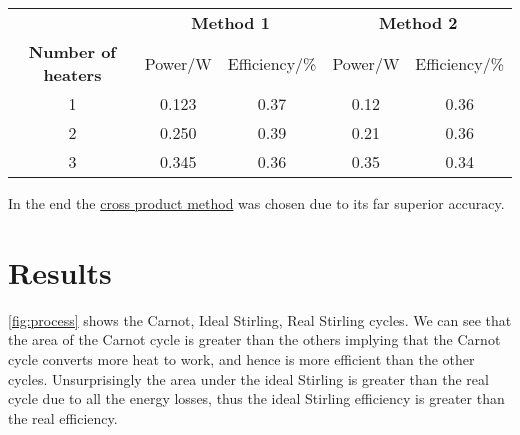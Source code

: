 \documentclass[10pt]{article}
\begin{document}
\begin{table}[h]
\centering
\begin{tabular}{@{}ccccc@{}}
\toprule
&\multicolumn{2}{c}{\bfseries Method 1}
&\multicolumn{2}{c}{\bfseries Method 2} 
\\
\cmidrule(lr){2-3} \cmidrule(l){4-5} 
\bfseries Number of heaters 
& Power/W & Efficiency/\%
& Power/W & Efficiency/\%
\\
\midrule
1 & 0.123 & 0.37 & 0.12 & 0.36 \\
2 & 0.250 & 0.39 & 0.21 & 0.36\\
3 & 0.345 & 0.36 & 0.35 & 0.34\\
\bottomrule
\end{tabular}

\label{table:poeff}
\end{table}
\FloatBarrier
\noindent
In the end the  \hyperref[Method 2]{cross product method} was chosen due to its far superior accuracy.


\section{Results}

\noindent
\autoref{fig:process} shows the Carnot, Ideal Stirling, Real Stirling cycles. We can see that the area of the Carnot cycle is greater than the others implying that the Carnot cycle converts more heat to work, and hence is more efficient than the other cycles. Unsurprisingly the area under the ideal Stirling is greater than the real cycle due to all the energy losses, thus the ideal Stirling efficiency is greater than the real efficiency.
\pagebreak
\end{document}

